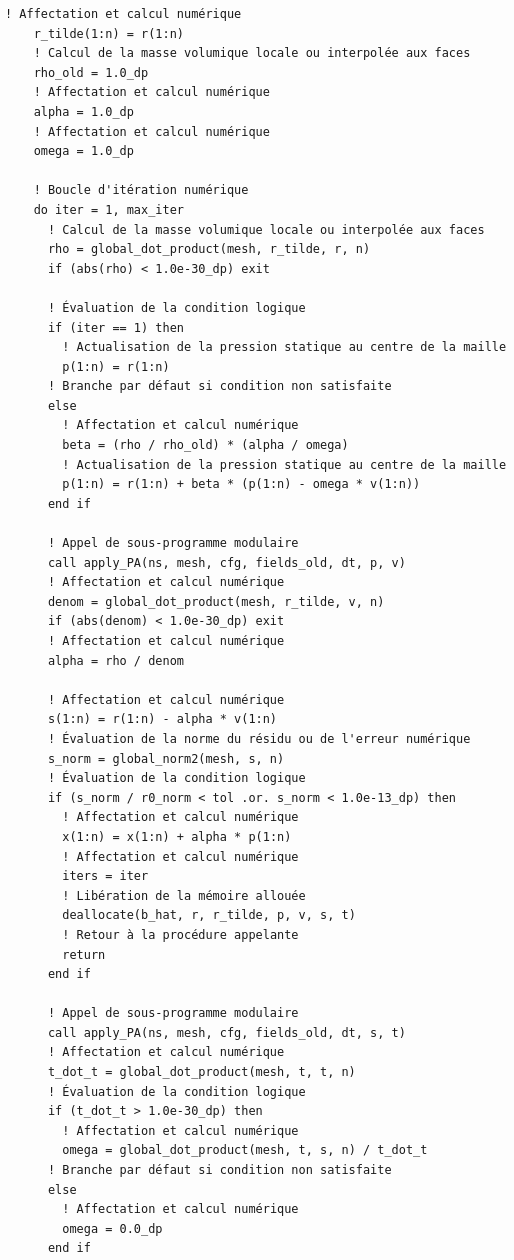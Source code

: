 \documentclass[10pt,a4paper,oneside]{book}
\begin{document}
\begin{lstlisting}[language={[95]Fortran}]
    ! Affectation et calcul numérique
    r_tilde(1:n) = r(1:n)
    ! Calcul de la masse volumique locale ou interpolée aux faces
    rho_old = 1.0_dp
    ! Affectation et calcul numérique
    alpha = 1.0_dp
    ! Affectation et calcul numérique
    omega = 1.0_dp

    ! Boucle d'itération numérique
    do iter = 1, max_iter
      ! Calcul de la masse volumique locale ou interpolée aux faces
      rho = global_dot_product(mesh, r_tilde, r, n)
      if (abs(rho) < 1.0e-30_dp) exit

      ! Évaluation de la condition logique
      if (iter == 1) then
        ! Actualisation de la pression statique au centre de la maille
        p(1:n) = r(1:n)
      ! Branche par défaut si condition non satisfaite
      else
        ! Affectation et calcul numérique
        beta = (rho / rho_old) * (alpha / omega)
        ! Actualisation de la pression statique au centre de la maille
        p(1:n) = r(1:n) + beta * (p(1:n) - omega * v(1:n))
      end if

      ! Appel de sous-programme modulaire
      call apply_PA(ns, mesh, cfg, fields_old, dt, p, v)
      ! Affectation et calcul numérique
      denom = global_dot_product(mesh, r_tilde, v, n)
      if (abs(denom) < 1.0e-30_dp) exit
      ! Affectation et calcul numérique
      alpha = rho / denom

      ! Affectation et calcul numérique
      s(1:n) = r(1:n) - alpha * v(1:n)
      ! Évaluation de la norme du résidu ou de l'erreur numérique
      s_norm = global_norm2(mesh, s, n)
      ! Évaluation de la condition logique
      if (s_norm / r0_norm < tol .or. s_norm < 1.0e-13_dp) then
        ! Affectation et calcul numérique
        x(1:n) = x(1:n) + alpha * p(1:n)
        ! Affectation et calcul numérique
        iters = iter
        ! Libération de la mémoire allouée
        deallocate(b_hat, r, r_tilde, p, v, s, t)
        ! Retour à la procédure appelante
        return
      end if

      ! Appel de sous-programme modulaire
      call apply_PA(ns, mesh, cfg, fields_old, dt, s, t)
      ! Affectation et calcul numérique
      t_dot_t = global_dot_product(mesh, t, t, n)
      ! Évaluation de la condition logique
      if (t_dot_t > 1.0e-30_dp) then
        ! Affectation et calcul numérique
        omega = global_dot_product(mesh, t, s, n) / t_dot_t
      ! Branche par défaut si condition non satisfaite
      else
        ! Affectation et calcul numérique
        omega = 0.0_dp
      end if


\end{lstlisting}
\end{document}
